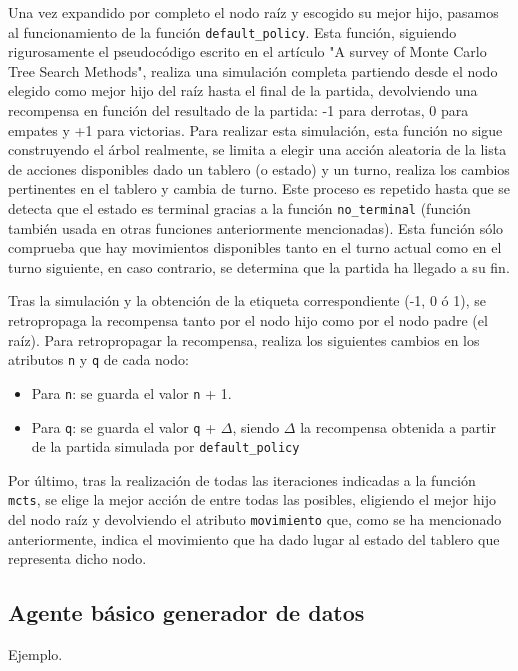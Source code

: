 \documentclass[conference]{IEEEtran}
\begin{document}
Una vez expandido por completo el nodo raíz y escogido su mejor hijo, pasamos al funcionamiento de la función \texttt{default\_policy}. Esta función, siguiendo rigurosamente el pseudocódigo escrito en el artículo "A survey of Monte Carlo Tree Search Methods", realiza una simulación completa partiendo desde el nodo elegido como mejor hijo del raíz hasta el final de la partida, devolviendo una recompensa en función del resultado de la partida: -1 para derrotas, 0 para empates y +1 para victorias. Para realizar esta simulación, esta función no sigue construyendo el árbol realmente, se limita a elegir una acción aleatoria de la lista de acciones disponibles dado un tablero (o estado) y un turno, realiza los cambios pertinentes en el tablero y cambia de turno. Este proceso es repetido hasta que se detecta que el estado es terminal gracias a la función \texttt{no\_terminal} (función también usada en otras funciones anteriormente mencionadas). Esta función sólo comprueba que hay movimientos disponibles tanto en el turno actual como en el turno siguiente, en caso contrario, se determina que la partida ha llegado a su fin.

Tras la simulación y la obtención de la etiqueta correspondiente (-1, 0 ó 1), se retropropaga la recompensa tanto por el nodo hijo como por el nodo padre (el raíz). Para retropropagar la recompensa, realiza los siguientes cambios en los atributos \texttt{n} y \texttt{q} de cada nodo:

\begin{itemize}
    \item Para \texttt{n}: se guarda el valor \texttt{n} + 1.
    \item Para \texttt{q}: se guarda el valor \texttt{q} + $\Delta$, siendo $\Delta$ la recompensa obtenida a partir de la partida simulada por \texttt{default\_policy}
\end{itemize}

Por último, tras la realización de todas las iteraciones indicadas a la función \texttt{mcts}, se elige la mejor acción de entre todas las posibles, eligiendo el mejor hijo del nodo raíz y devolviendo el atributo \texttt{movimiento} que, como se ha mencionado anteriormente, indica el movimiento que ha dado lugar al estado del tablero que representa dicho nodo.

\subsection{Agente básico generador de datos}
Ejemplo.
\end{document}
